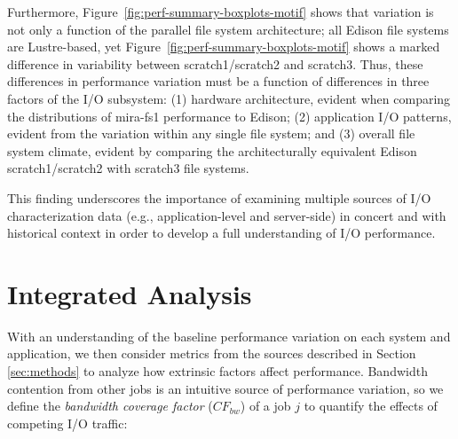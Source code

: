 Furthermore, Figure~\ref{fig:perf-summary-boxplots-motif} shows that variation is not only a function of the parallel file system architecture; all Edison file systems are Lustre-based, yet Figure~\ref{fig:perf-summary-boxplots-motif} shows a marked difference in variability between scratch1/scratch2 and scratch3.
Thus, these differences in performance variation must be a function of differences in three factors of the I/O subsystem:
(1) hardware architecture, evident when comparing the distributions of mira-fs1 performance to Edison;
(2) application I/O patterns, evident from the variation within any single file system; and
(3) overall file system climate, evident by comparing the architecturally equivalent Edison scratch1/scratch2 with scratch3 file systems.

This finding underscores the importance of examining multiple sources of I/O characterization data (e.g., application-level and server-side) in concert and with historical context in order to develop a full understanding of I/O performance.

\section{Integrated Analysis} \label{sec:results/umami}

With an understanding of the baseline performance variation on each system and application, we then consider metrics from the sources described in Section \ref{sec:methods} to analyze how extrinsic factors affect performance.
Bandwidth contention from other jobs is an intuitive source of performance variation, so we define the \emph{bandwidth coverage factor} ($\mathit{CF}_{\mathit{bw}}$) of a job $j$ to quantify the effects of competing I/O traffic:

